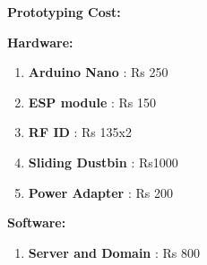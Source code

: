 \textup{\huge {\bf Prototyping Cost: } \\[0.01in] }

\textup{\large {\bf Hardware: } \\[0.00001in] }
\begin{enumerate} %
	\item{\normalsize {\bf Arduino Nano} : Rs 250}
	\item {\normalsize  {\bf ESP module} : Rs 150 }
	\item {\normalsize  {\bf RF ID } :  Rs 135x2 }
	\item {\normalsize  {\bf Sliding Dustbin } :  Rs1000  }
	\item {\normalsize {\bf Power Adapter} : Rs 200 \\}
\end{enumerate}
\textup{\large {\bf Software: } \\[0.00001in] }
\begin{enumerate} %
	\item{\normalsize {\bf Server and Domain} : Rs 800}

\end{enumerate}
\newpage
